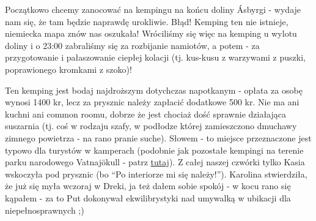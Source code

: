 
Początkowo chcemy zanocować na kempingu na końcu doliny Ásbyrgi - wydaje nam się, że tam będzie naprawdę urokliwie. Błąd! Kemping ten nie istnieje, niemiecka mapa znów nas oszukała! Wróciliśmy się więc na kemping u wylotu doliny i o 23:00 zabraliśmy się za rozbijanie namiotów, a potem - za przygotowanie i pałaszowanie ciepłej kolacji (tj. kus-kusu z warzywami z puszki, poprawionego kromkami z szoko)!

Ten kemping jest bodaj najdroższym dotychczas napotkanym - opłata za osobę wynosi 1400 kr, lecz za prysznic należy zapłacić dodatkowe 500 kr. Nie ma ani kuchni ani common roomu, dobrze że jest chociaż dość sprawnie działająca suszarnia (tj. coś w rodzaju szafy, w podłodze której zamieszczono dmuchawy zimnego powietrza - na rano pranie suche). Słowem - to miejsce przeznaczone jest typowo dla turystów w kamperach (podobnie jak pozostałe kempingi na terenie parku narodowego Vatnajökull - patrz \href{http://www.vatnajokulsthjodgardur.is/english/plan-your-visit/camping/}{tutaj}). Z całej naszej czwórki tylko Kasia wskoczyła pod prysznic (bo “Po interiorze mi się należy!”). Karolina stwierdziła, że już się myła wczoraj  w Dreki, ja też dałem sobie spokój - w kocu rano się kąpałem - za to Put dokonywał ekwilibrystyki nad umywalką w ubikacji dla niepełnosprawnych ;)

